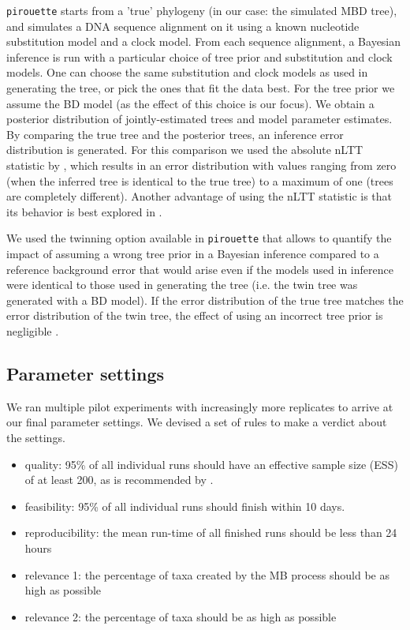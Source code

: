 \verb;pirouette; starts from a 'true'  phylogeny (in our case: the simulated MBD tree), and simulates a DNA sequence alignment on it using a known nucleotide substitution model and a clock model. 
From each sequence alignment, a Bayesian inference is run with a particular choice of tree prior and substitution and clock models. One can choose the same substitution and clock models as used in generating the tree, or pick the ones that fit the data best. For the tree prior we assume the BD model (as the effect of this choice is our focus). We obtain a posterior distribution of jointly-estimated trees and model parameter estimates.
By comparing the true tree and the posterior trees, an inference error distribution is generated. For this comparison we used the absolute nLTT statistic by \citet{janzen2015}, which results in an error distribution with values ranging from zero (when the inferred tree is identical to the true tree) to a maximum of one (trees are completely different).
Another advantage of using the nLTT statistic is that its behavior is best
explored in \citet{bilderbeek2019pirouette}.

We used the twinning option available in \verb;pirouette; that allows to quantify the impact of assuming a wrong tree prior in a Bayesian inference compared to a reference background error that would arise even if the models used in inference were identical to those used in generating the tree (i.e. the twin tree was generated with a BD model).
If the error distribution of the true tree matches the error distribution
of the twin tree, the effect of using an incorrect tree prior is negligible \citet{bilderbeek2019pirouette}.

\subsection{Parameter settings}

We ran multiple pilot experiments with increasingly more replicates to arrive 
at our final parameter settings. We devised a set of rules to make a 
verdict about the settings.  

\begin{itemize}
  \item quality: 95\% of all individual runs should have an effective
    sample size (ESS) of at least 200, as is recommended by \cite{beastbook}.
  \item feasibility: 95\% of all individual runs should finish within 10 days.
  \item reproducibility: the mean run-time of all finished runs should be less than 24 hours 
  \item relevance 1: the percentage of taxa created by the MB process should be
    as high as possible
  \item relevance 2: the percentage of taxa should be
    as high as possible
\end{itemize}

